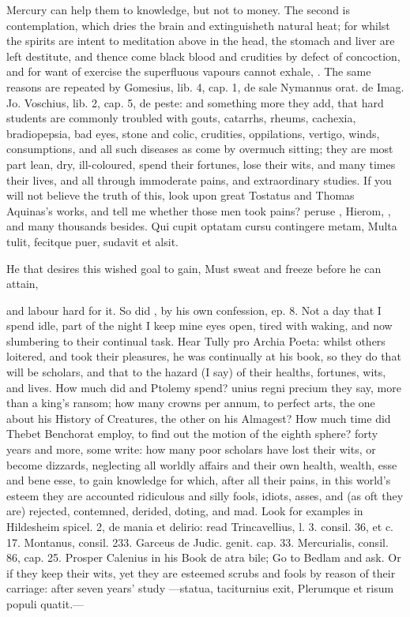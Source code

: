 {Mercury can help them to knowledge, but not to money. The second is
contemplation, which dries the brain and extinguisheth natural
heat; for whilst the spirits are intent to meditation above in the
head, the stomach and liver are left destitute, and thence come black
blood and crudities by defect of concoction, and for want of exercise
the superfluous vapours cannot exhale, \etc{}. The same reasons are
repeated by Gomesius, lib. 4, cap. 1, de sale Nymannus orat. de
Imag. Jo. Voschius, lib. 2, cap. 5, de peste: and something more they
add, that hard students are commonly troubled with gouts, catarrhs,
rheums, cachexia, bradiopepsia, bad eyes, stone and colic,
crudities, oppilations, vertigo, winds, consumptions, and all
such diseases as come by overmuch sitting; they are most part lean,
dry, ill-coloured, spend their fortunes, lose their wits, and many
times their lives, and all through immoderate pains, and extraordinary
studies. If you will not believe the truth of this, look upon great
Tostatus and Thomas Aquinas's works, and tell me whether those men took
pains? peruse \Austin{}, Hierom, \etc{}, and many thousands besides.
Qui cupit optatam cursu contingere metam,
Multa tulit, fecitque puer, sudavit et alsit.

He that desires this wished goal to gain,
Must sweat and freeze before he can attain,

and labour hard for it. So did \Seneca, by his own confession, ep. 8.
Not a day that I spend idle, part of the night I keep mine eyes
open, tired with waking, and now slumbering to their continual task.
Hear Tully pro Archia Poeta: whilst others loitered, and took their
pleasures, he was continually at his book, so they do that will be
scholars, and that to the hazard (I say) of their healths, fortunes,
wits, and lives. How much did \Aristotle and Ptolemy spend? unius regni
precium they say, more than a king's ransom; how many crowns per annum,
to perfect arts, the one about his History of Creatures, the other on
his Almagest? How much time did Thebet Benchorat employ, to find out
the motion of the eighth sphere? forty years and more, some write: how
many poor scholars have lost their wits, or become dizzards, neglecting
all worldly affairs and their own health, wealth, esse and bene esse,
to gain knowledge for which, after all their pains, in this world's
esteem they are accounted ridiculous and silly fools, idiots, asses,
and (as oft they are) rejected, contemned, derided, doting, and mad.
Look for examples in Hildesheim spicel. 2, de mania et delirio: read
Trincavellius, l. 3. consil. 36, et c. 17. Montanus, consil. 233.
Garceus de Judic. genit. cap. 33. Mercurialis, consil. 86, cap.
25. Prosper Calenius in his Book de atra bile; Go to Bedlam and
ask. Or if they keep their wits, yet they are esteemed scrubs and fools
by reason of their carriage: after seven years' study
---statua, taciturnius exit,
Plerumque et risum populi quatit.---

}
